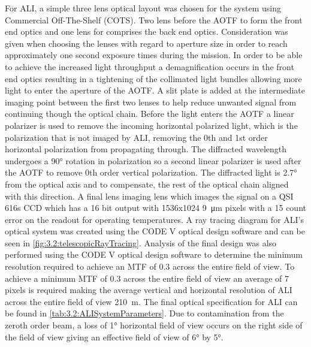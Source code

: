 \documentclass[12pt]{article}
\begin{document}
For ALI, a simple three lens optical layout was chosen for the system using Commercial Off-The-Shelf (COTS). Two lens before the AOTF to form the front end optics and one lens for comprises the back end optics. Consideration was given when choosing the lenses with regard to aperture size in order to reach approximately one second exposure times during the mission. In order to be able to achieve the increased light throughput a demagnification occurs in the front end optics resulting in a tightening of the collimated light bundles allowing more light to enter the aperture of the AOTF. A slit plate is added at the intermediate imaging point between the first two lenses to help reduce unwanted signal from continuing though the optical chain. Before the light enters the AOTF a linear polarizer is used to remove the incoming horizontal polarized light, which is the polarization that is not imaged by ALI, removing the 0th and 1st order horizontal polarization from propagating through. The diffracted wavelength undergoes a 90\si{\degree} rotation in polarization so a second linear polarizer is used after the AOTF to remove 0th order vertical polarization. The diffracted light is 2.7\si{\degree} from the optical axis and to compensate, the rest of the optical chain aligned with this direction. A final lens imaging lens which images the signal on a QSI 616s CCD which has a 16 bit output with 1536x1024 9~\si{\micro\metre} pixels with a 15 count error on the readout for operating temperatures. A ray tracing diagram for ALI's optical system was created using the CODE V optical design software and can be seen in \autoref{fig:3.2:telescopicRayTracing}. Analysis of the final design was also performed using the CODE V optical design software to determine the minimum resolution required to achieve an MTF of 0.3 across the entire field of view. To achieve a minimum MTF of 0.3 across the entire field of view an average of 7 pixels is required making the average vertical and horizontal resolution of ALI across the entire field of view 210~m. The final optical specification for ALI can be found in \autoref{tab:3.2:ALISystemParameters}. Due to contamination from the zeroth order beam, a loss of 1\si{\degree} horizontal field of view occurs on the right side of the field of view giving an effective field of view of 6\si{\degree} by 5\si{\degree}.
\end{document}
